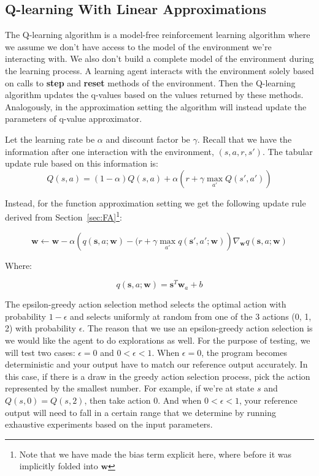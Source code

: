 \documentclass[11pt]{article}
\numberwithin{equation}{section} %
\numberwithin{figure}{section} %
\numberwithin{table}{section} %
\newcommand{\sv}{\mathbf{s}}
\newcommand{\wv}{\mathbf{w}}
\begin{document}
\subsection{Q-learning With Linear Approximations}
The Q-learning algorithm is a model-free reinforcement learning algorithm where we assume we don't have access to the model of the environment we're interacting with. We also don't build a complete model of the environment during the learning process. A learning agent interacts with the environment solely based on calls to \textbf{step} and \textbf{reset} methods of the environment. Then the Q-learning algorithm updates the q-values based on the values returned by these methods. Analogously, in the approximation setting the algorithm will instead update the parameters of q-value approximator.


Let the learning rate be $\alpha$ and discount factor be $\gamma$. Recall that we have the information after one interaction with the environment, $(s, a, r, s')$. The tabular update rule based on this information is: 
\[
    Q(s,a) = (1 - \alpha) Q(s, a) + \alpha \left(r + \gamma \max_{a'} Q(s', a')\right)
\]

Instead, for the function approximation setting we get the following update rule derived from Section~\ref{sec:FA}\footnote{Note that we have made the bias term explicit here, where before it was implicitly folded into $\wv$ }:

\[
\wv \leftarrow \wv - \alpha \left(q(\sv, a; \wv) - (r + \gamma \max_{a'} q(\sv', a'; \wv)\right) \nabla_\wv q(\sv, a; \wv)
\]

Where:

\[
q(\sv,a;\wv) = \sv^T \wv_a + b
\]

The epsilon-greedy action selection method selects the optimal action with probability $1 - \epsilon$ and selects uniformly at random from one of the 3 actions (0, 1, 2) with probability $\epsilon$. The reason that we use an epsilon-greedy action selection is we would like the agent to do explorations as well. For the purpose of testing, we will test two cases: $\epsilon = 0$ and $0 < \epsilon < 1$. When $\epsilon = 0$, the program becomes deterministic and your output have to match our reference output accurately. In this case, if there is a draw in the greedy action selection process, pick the action represented by the smallest number. For example, if we're at state $s$ and $Q(s, 0) = Q(s, 2)$, then take action $0$. And when $0 < \epsilon < 1$, your reference output will need to fall in a certain range that we determine by running exhaustive experiments based on the input parameters.
\end{document}
